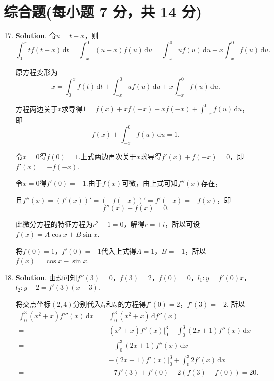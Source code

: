 \documentclass[../Main.tex]{subfiles}
\begin{document}
\section{综合题(每小题 7 分，共 14 分)}
\begin{enumerate}
    \setcounter{enumi}{16}
    \item \textbf{Solution}. 令$u=t-x$，则
          \[
              \int_{0}^{x}tf(t-x)\,\mathrm{d}t = \int_{-x}^{0}(u+x)f(u)\,\mathrm{d}u=\int_{-x}
              ^{0}uf(u)\,\mathrm{d}u+x\int_{-x}^{0}f(u)\,\mathrm{d}u.
          \]

          原方程变形为
          \[
              x=\int_{0}^{x}f(t)\,\mathrm{d}t+\int_{-x}^{0}uf(u)\,\mathrm{d}u+x\int_{-x}^{0}
              f(u)\,\mathrm{d}u.
          \]

          方程两边关于$x$求导得$1=f(x)+xf(-x)-xf(-x)+\int_{-x}^{0}f(u)\,\mathrm{d}u$，即
          \[
              f(x)+\int_{-x}^{0}f(u)\,\mathrm{d}u=1.
          \]

          令$x=0$得$f(0)=1$.上式两边再次关于$x$求导得$f'(x)+f(-x)=0$，即$f'(x)=-f(-x)$.

          令$x=0$得$f'(0)=-1$.由于$f(x)$可微，由上式可知$f''(x)$存在，

          且$f''(x)=(f'(x))'=(-f(-x))'=f'(-x)=-f(x)$，即
          \[
              f''(x)+f(x)=0.
          \]

          此微分方程的特征方程为$r^{2}+1=0$，解得$r=\pm i$，所以可设$f(x)=A\cos x+B\sin
              x$.

          将$f(0)=1$，$f'(0)=-1$代入上式得$A=1$，$B=-1$，所以$f(x)=\cos x-\sin x$.

    \item \textbf{Solution}. 由题可知$f''(3)=0$，$f(3)=2$，$f(0)=0$，$l_{1}:
              y=f'(0)x$，$l_{2}:y-2=f'(3)(x-3)$.

          将交点坐标$(2,4)$分别代入$l_{1}$和$l_{2}$的方程得$f'(0)=2$，$f'(3)=-2$.
          所以
          \[
              \begin{aligned}
                  \int_{0}^{3}(x^{2}+x)f'''(x)\,\mathrm{d}x = & \int_{0}^{3}(x^{2}+x)\,\mathrm{d}f''(x)                             \\
                  =                                           & (x^{2}+x)f''(x)\bigg|_{0}^{3}-\int_{0}^{3}(2x+1)f''(x)\,\mathrm{d}x \\
                  =                                           & -\int_{0}^{3}(2x+1)f''(x)\,\mathrm{d}x                              \\
                  =                                           & -(2x+1)f'(x)\bigg|_{0}^{3}+\int_{0}^{3}2f'(x)\,\mathrm{d}x          \\
                  =                                           & -7f'(3)+f'(0)+2(f(3)-f(0)) = 20.
              \end{aligned}
          \]
\end{enumerate}
\end{document}
